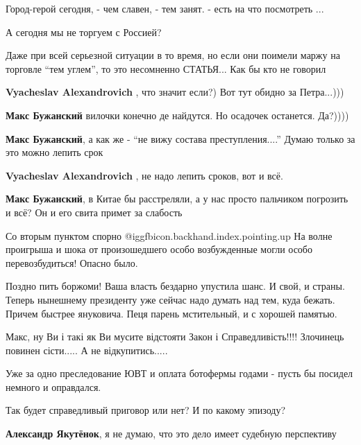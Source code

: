 \begin{itemize}
Город-герой сегодня, - чем славен, - тем занят. - есть на что посмотреть ...

А сегодня мы не торгуем с Россией?


Даже при всей серьезной ситуации в то время, но если они поимели маржу на
торговле \enquote{тем углем}, то это несомненно СТАТЬЯ... Как бы кто не говорил

\begin{itemize} %
\textbf{Vyacheslav Alexandrovich} , что значит если?) Вот тут обидно за Петра...)))

\textbf{Макс Бужанский} вилочки конечно де найдутся. Но осадочек останется. Да?))))

\textbf{Макс Бужанский}, а как же - \enquote{не вижу состава преступления....} Думаю только за это можно лепить срок

\textbf{Vyacheslav Alexandrovich} , не надо лепить сроков, вот и всё.

\textbf{Макс Бужанский}, в Китае бы расстреляли, а у нас просто пальчиком погрозить и всё? Он и его свита примет за слабость
\end{itemize} %


Со вторым пунктом спорно @igg{fbicon.backhand.index.pointing.up} На волне
проигрыша и шока от произошедшего особо возбужденные могли особо
перевозбудиться! Опасно было.


Поздно пить боржоми! Ваша власть бездарно упустила шанс. И свой, и страны.
Теперь нынешнему президенту уже сейчас надо думать над тем, куда бежать. Причем
быстрее януковича. Пеця парень мстительный, и с хорошей памятью.


Макс, ну Ви і такі як Ви мусите відстояти Закон і Справедливість!!!! Злочинець
повинен сісти..... А не відкупитись.....

Уже за одно преследование ЮВТ и оплата ботофермы годами - пусть бы посидел
немного и оправдался.

Так будет справедливый приговор или нет? И по какому эпизоду?

\begin{itemize} %
\textbf{Александр Якутёнок}, я не думаю, что это дело имеет судебную перспективу


\end{itemize}
\end{itemize}
